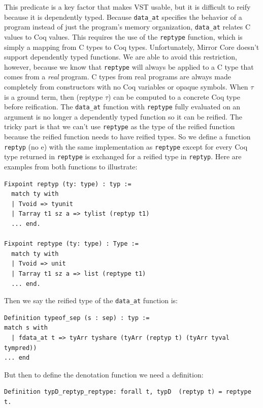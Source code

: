\documentclass{puthesis}
\begin{document}
This predicate is a key factor that makes VST usable, but it is
difficult to reify because it is dependently typed.
Because \lstinline|data_at| specifies the behavior of a program
instead of just the program's memory organization, \lstinline|data_at|
relates C values to Coq values. This requires the use of the
\lstinline|reptype| function, which is simply a mapping from C types
to Coq types. Unfortunately, Mirror Core doesn't support dependently
typed functions. We are able to avoid this restriction, however,
because we know that \lstinline|reptype| will always be applied to a C
type that comes from a \emph{real} program. C types from real programs
are always made completely from constructors with no Coq variables or
opaque symbols.  When $\tau$ is a ground term, then (reptype $\tau$) can be
computed to a concrete Coq type before reification. The
\lstinline|data_at| function with \lstinline|reptype| fully
evaluated on an argument is no longer a dependently typed function so
it can be reified. The tricky part is that we can't use
\lstinline|reptype| as the type of the reified function because the
reified function needs to have reified types. So we define a function
\lstinline|reptyp| (no e) with the same implementation as
\lstinline|reptype| except for every Coq type returned in
\lstinline|reptype| is exchanged for a reified type in
\lstinline|reptyp|. Here are examples from both functions to
illustrate:

\begin{lstlisting}
Fixpoint reptyp (ty: type) : typ :=
  match ty with
  | Tvoid => tyunit
  | Tarray t1 sz a => tylist (reptyp t1)
  ... end.

Fixpoint reptype (ty: type) : Type :=
  match ty with
  | Tvoid => unit
  | Tarray t1 sz a => list (reptype t1)
  ... end.
\end{lstlisting}

Then we say the reified type of the \lstinline|data_at| function is:
\pagebreak
\begin{lstlisting}
Definition typeof_sep (s : sep) : typ :=
match s with
  | fdata_at t => tyArr tyshare (tyArr (reptyp t) (tyArr tyval tympred))
... end
\end{lstlisting}

But then to define the denotation function we need a definition:

\begin{lstlisting}
Definition typD_reptyp_reptype: forall t, typD  (reptyp t) = reptype t.
\end{lstlisting}
\end{document}
